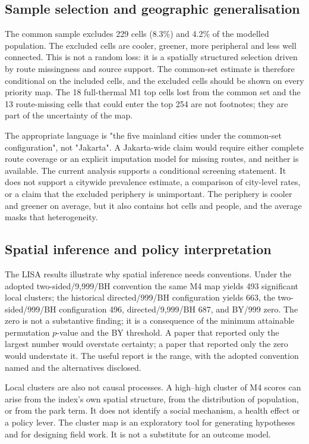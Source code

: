 \documentclass[times,twoside]{_Templates/MultiTargetManuscript}
\begin{document}
\subsection{Sample selection and geographic generalisation}

The common sample excludes 229 cells (8.3\%) and 4.2\% of the modelled
population. The excluded cells are cooler, greener, more peripheral and less
well connected. This is not a random loss: it is a spatially structured
selection driven by route missingness and source support. The common-set
estimate is therefore conditional on the included cells, and the excluded cells
should be shown on every priority map. The 18 full-thermal M1 top cells lost from
the common set and the 13 route-missing cells that could enter the top 254 are
not footnotes; they are part of the uncertainty of the map.

The appropriate language is "the five mainland cities under the common-set
configuration", not "Jakarta". A Jakarta-wide claim would require either
complete route coverage or an explicit imputation model for missing routes, and
neither is available. The current analysis supports a conditional screening
statement. It does not support a citywide prevalence estimate, a comparison of
city-level rates, or a claim that the excluded periphery is unimportant. The
periphery is cooler and greener on average, but it also contains hot cells and
people, and the average masks that heterogeneity.

\subsection{Spatial inference and policy interpretation}

The LISA results illustrate why spatial inference needs conventions. Under the
adopted two-sided/9,999/BH convention the same M4 map yields 493 significant
local clusters; the historical directed/999/BH configuration yields 663, the
two-sided/999/BH configuration 496, directed/9,999/BH 687, and BY/999 zero. The
zero is not a substantive finding; it is a consequence of the minimum attainable
permutation $p$-value and the BY threshold. A paper that reported only the
largest number would overstate certainty; a paper that reported only the zero
would understate it. The useful report is the range, with the adopted convention
named and the alternatives disclosed.

Local clusters are also not causal processes. A high--high cluster of M4 scores
can arise from the index's own spatial structure, from the distribution of
population, or from the park term. It does not identify a social mechanism, a
health effect or a policy lever. The cluster map is an exploratory tool for
generating hypotheses and for designing field work. It is not a substitute for
an outcome model.
\end{document}
